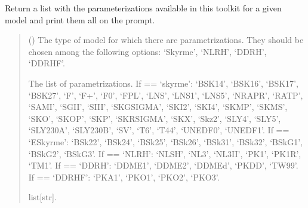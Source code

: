 \documentclass[letterpaper,10pt,english]{sphinxmanual}
\begin{document}

\begin{fulllineitems}
\label{\detokenize{source/api/setup_matter_pheno_esym:nucleardatapy.matter.setup_pheno_esym.pheno_esym_params}}
\pysigstartsignatures
{}
\pysigstopsignatures
\sphinxAtStartPar
Return a list with the parameterizations available in
this toolkit for a given model and print them all on the prompt.
\begin{quote}\begin{description}
\sphinxAtStartPar
{} () \textendash{} The type of model for which there are parametrizations.     They should be chosen among the following options: ‘Skyrme’, ‘NLRH’,     ‘DDRH’, ‘DDRHF’.

\sphinxAtStartPar
The list of parametrizations.     If  == ‘skyrme’: ‘BSK14’,     ‘BSK16’, ‘BSK17’, ‘BSK27’, ‘F\sphinxhyphen{}’, ‘F+’, ‘F0’, ‘FPL’, ‘LNS’, ‘LNS1’, ‘LNS5’,     ‘NRAPR’, ‘RATP’, ‘SAMI’, ‘SGII’, ‘SIII’, ‘SKGSIGMA’, ‘SKI2’, ‘SKI4’, ‘SKMP’,     ‘SKMS’, ‘SKO’, ‘SKOP’, ‘SKP’, ‘SKRSIGMA’, ‘SKX’, ‘Skz2’, ‘SLY4’, ‘SLY5’,     ‘SLY230A’, ‘SLY230B’, ‘SV’, ‘T6’, ‘T44’, ‘UNEDF0’, ‘UNEDF1’.     If  == ‘ESkyrme’: ‘BSk22’, ‘BSk24’, ‘BSk25’, ‘BSk26’, ‘BSk31’, ‘BSk32’,     ‘BSkG1’, ‘BSkG2’, ‘BSkG3’.     If  == ‘NLRH’: ‘NL\sphinxhyphen{}SH’, ‘NL3’, ‘NL3II’, ‘PK1’, ‘PK1R’, ‘TM1’.     If  == ‘DDRH’: ‘DDME1’, ‘DDME2’, ‘DDMEd’, ‘PKDD’, ‘TW99’.     If  == ‘DDRHF’: ‘PKA1’, ‘PKO1’, ‘PKO2’, ‘PKO3’.

\sphinxAtStartPar
list{[}str{]}.

\end{description}\end{quote}

\end{fulllineitems}

\end{document}

